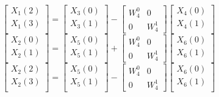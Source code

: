 \documentclass[journal,12pt,twocolumn]{IEEEtran}
\numberwithin{equation}{section}
\renewcommand\thesection{\arabic{section}}
\begin{document}
\begin{enumerate}[label=\arabic*.,ref=\thesection.\theenumi]
\begin{equation}
\begin{bmatrix}
X_{1}(2) \\ 
X_{1}(3)\\ 
\end{bmatrix}
=
\begin{bmatrix}
X_{3}(0) \\ 
X_{3}(1)\\ 
\end{bmatrix}
-
\begin{bmatrix}
W^{0}_{4} & 0\\
0 & W^{1}_{4}
\end{bmatrix}
\begin{bmatrix}
X_{4}(0) \\ 
X_{4}(1) \\ 
\end{bmatrix}
\end{equation}
\begin{equation}
\begin{bmatrix}
X_{2}(0) \\ 
X_{2}(1)\\ 
\end{bmatrix}
=
\begin{bmatrix}
X_{5}(0) \\ 
X_{5}(1)\\ 
\end{bmatrix}
+
\begin{bmatrix}
W^{0}_{4} & 0\\
0 & W^{1}_{4}
\end{bmatrix}
\begin{bmatrix}
X_{6}(0) \\ 
X_{6}(1) \\ 
\end{bmatrix}
\end{equation}
\begin{equation}
\begin{bmatrix}
X_{2}(2) \\ 
X_{2}(3)\\ 
\end{bmatrix}
=
\begin{bmatrix}
X_{5}(0) \\ 
X_{5}(1)\\ 
\end{bmatrix}
-
\begin{bmatrix}
W^{0}_{4} & 0\\
0 & W^{1}_{4}
\end{bmatrix}
\begin{bmatrix}
X_{6}(0) \\ 
X_{6}(1) \\ 

\end{bmatrix}
\end{equation}
\end{enumerate}
\end{document}
